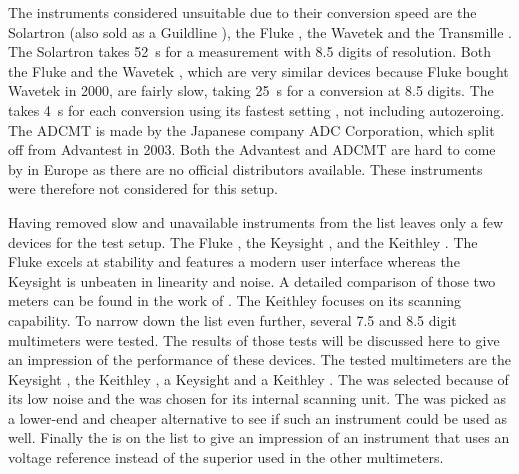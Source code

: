 The instruments considered unsuitable due to their conversion speed are the Solartron  (also sold as a Guildline ), the Fluke , the Wavetek  and the Transmille . The Solartron  takes \qty{52}{\s} for a measurement with \num{8.5} digits of resolution. Both the Fluke  and the Wavetek , which are very similar devices because Fluke bought Wavetek in 2000, are fairly slow, taking \qty{25}{\second} for a conversion at \num{8.5} digits. The  takes \qty{4}{\s} for each conversion using its fastest setting \cite{datasheet_transmille8104}, not including autozeroing. The ADCMT  is made by the Japanese company ADC Corporation, which split off from Advantest in 2003. Both the Advantest  and ADCMT  are hard to come by in Europe as there are no official distributors available. These instruments were therefore not considered for this setup.

Having removed slow and unavailable instruments from the list leaves only a few devices for the test setup. The Fluke , the Keysight , and the Keithley . The Fluke  excels at stability and features a modern user interface whereas the Keysight  is unbeaten in linearity and noise. A detailed comparison of those two meters can be found in the work of \citeauthor{article_fluke_8588A_noise} \cite{article_fluke_8588A_noise}. The Keithley  focuses on its scanning capability. To narrow down the list even further, several \num{7.5} and \num{8.5} digit multimeters were tested. The results of those tests will be discussed here to give an impression of the performance of these devices. The tested multimeters are the Keysight , the Keithley , a Keysight  and a Keithley . The  was selected because of its low noise and the  was chosen for its internal scanning unit. The  was picked as a lower-end and cheaper alternative to see if such an instrument could be used as well. Finally the  is on the list to give an impression of an instrument that uses an  voltage reference instead of the superior  used in the other multimeters.

